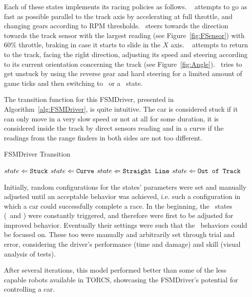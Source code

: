 Each of these states implements its racing policies as follows. \SL~ attempts to go as fast as possible parallel to the track axis by accelerating at full throttle, and changing gears according to RPM thresholds. \C~steers towards the direction towards the track sensor with the largest reading (see Figure~\ref{fig:FSensor}) with 60\% throttle, braking in case it starts to slide in the $X$ axis. \OT~ attempts to return to the track, facing the right direction, adjusting its speed and steering according to its current orientation concerning the track (see Figure~\ref{fig:Angle}). \St~tries to get unstuck by using the reverse gear and hard steering for a limited amount of game ticks and then switching to \OT~or a \racing~state.

The transition function for this FSMDriver, presented in Algorithm~\ref{alg:FSMDriver}, is quite intuitive. The car is considered stuck if it can only move in a very slow speed or not at all for some duration, it is considered inside the track by direct sensors reading and in a curve if the readings from the range finders in both sides are not too different.

\begin{algorithm}[!h]%
\caption{FSMDriver Transition}%
\label{alg:FSMDriver}%
\begin{algorithmic}
        \STATE $state \Leftarrow \texttt{Stuck}$
    \ELSE
				\STATE $state \Leftarrow \texttt{Curve}$
			\ELSE
				\STATE $state \Leftarrow \texttt{Straight Line}$
			\ENDIF
		\ELSE
			\STATE $state \Leftarrow \texttt{Out of Track}$
		\ENDIF
	\ENDIF
\end{algorithmic}
\end{algorithm}

Initially, random configurations for the states' parameters were set and manually adjusted until an acceptable behavior was achieved, i.e. such a configuration in which a car could successfully complete a race. In the beginning, the \recovery~states (\OT~and \St) were constantly triggered, and therefore were first to be adjusted for improved behavior. Eventually their settings were such that the \racing~behaviors could be focused on. These too were manually and arbitrarily set through trial and error, considering the driver's performance (time and damage) and skill (visual analysis of tests).

After several iterations, this model performed better than some of the less capable robots available in TORCS, showcasing the FSMDriver's potential for controlling a car.



